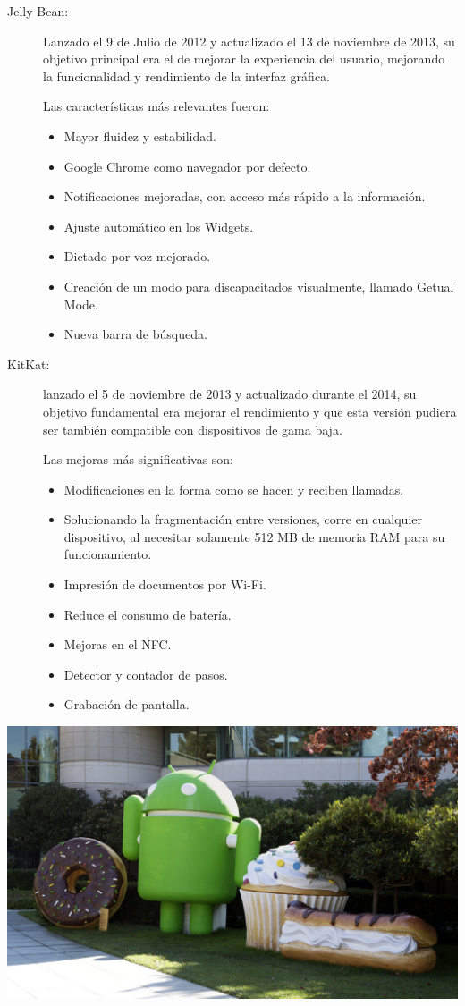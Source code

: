 \begin{description}
	\item[Jelly Bean:]
		 Lanzado el 9 de Julio de 2012 y actualizado el 13 de noviembre de 2013, su objetivo principal era el de mejorar la experiencia del usuario, mejorando la funcionalidad y 
		 rendimiento de la interfaz gráfica.
 
		 Las características más relevantes fueron:
		 \begin{itemize}
		 	\item Mayor fluidez y estabilidad.
		 	\item Google Chrome como navegador por defecto.
		 	\item Notificaciones mejoradas, con acceso más rápido a la información.
		 	\item Ajuste automático en los Widgets.
		 	\item Dictado por voz mejorado.
		 	\item Creación de un modo para discapacitados visualmente, llamado Getual Mode.
		 	\item Nueva barra de búsqueda.
		 \end{itemize}
	
	\item[KitKat:]
		lanzado el 5 de noviembre de 2013 y actualizado durante el 2014, su objetivo fundamental era mejorar el rendimiento y que esta versión pudiera ser también compatible con 
		dispositivos de gama baja.  
 
		Las mejoras más significativas son:
		\begin{itemize}
			\item Modificaciones en la forma como se hacen y reciben llamadas.
			\item Solucionando la fragmentación entre versiones, corre en cualquier dispositivo, al necesitar solamente 512 MB de memoria RAM para su funcionamiento.
			\item Impresión de documentos por Wi-Fi.
			\item Reduce el consumo de batería.
			\item Mejoras en el NFC.
			\item Detector y contador de pasos.
			\item Grabación de pantalla.
		\end{itemize}
\end{description}

\includegraphics[scale=0.5]{img/cp05/img0504.png}

